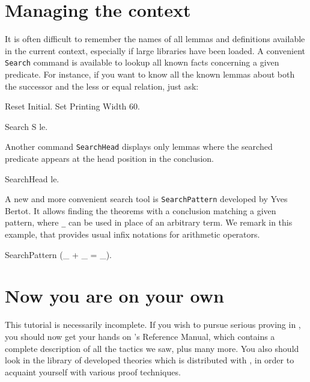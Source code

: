\documentclass[11pt,a4paper]{book}
\begin{document}
\section{Managing the context}

It is often difficult to remember the names of all lemmas and
definitions available in the current context, especially if large
libraries have been loaded. A convenient \verb:Search: command
is available to lookup all known facts 
concerning a given predicate. For instance, if you want to know all the
known lemmas about both the successor and the less or equal relation, just ask:
\begin{coq_eval}
Reset Initial.
Set Printing Width 60.
\end{coq_eval}
\begin{coq_example}
Search S le.
\end{coq_example}
Another command \verb:SearchHead: displays only lemmas where the searched
predicate appears at the head position in the conclusion.
\begin{coq_example}
SearchHead le.
\end{coq_example}

A new and more convenient search tool is \verb:SearchPattern:
developed by Yves Bertot. It allows finding the theorems with a
conclusion matching a given pattern, where \verb:_: can be used in
place of an arbitrary term. We remark in this example, that \Coq{}
provides usual infix notations for arithmetic operators.

\begin{coq_example}
SearchPattern (_ + _ = _).
\end{coq_example}

\section{Now you are on your own}

This tutorial is necessarily incomplete. If you wish to pursue serious
proving in \Coq, you should now get your hands on \Coq's Reference Manual,
which contains a complete description of all the tactics we saw, 
plus many more.
You also should look in the library of developed theories which is distributed
with \Coq, in order to acquaint yourself with various proof techniques.
\end{document}

